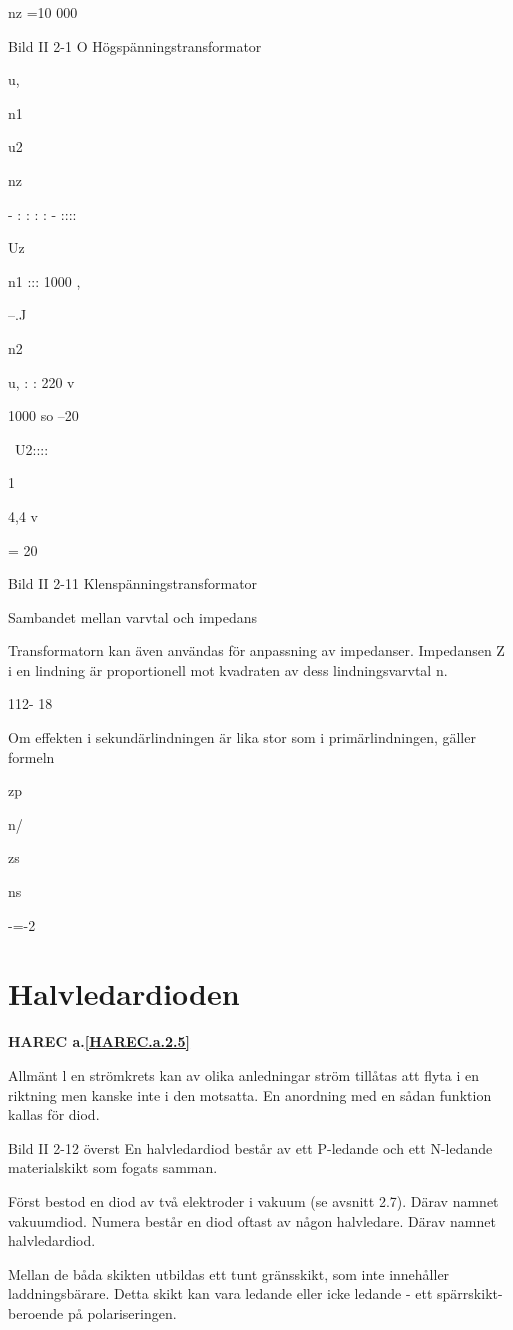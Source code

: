 {nz =10 000

Bild II 2-1 O Högspänningstransformator

u,

n1

u2

nz

- : : : : - ::::

Uz

n1 ::: 1000 ,   

--.J

n2

u, : : 220 v

1000
so
--20

~U2::::

1

4,4 v

= 20

Bild II 2-11 Klenspänningstransformator

Sambandet mellan varvtal och impedans

Transformatorn kan även användas för anpassning av impedanser. Impedansen Z i en
lindning är proportionell mot kvadraten av
dess lindningsvarvtal n.

112- 18

Om effekten i sekundärlindningen är lika
stor som i primärlindningen, gäller formeln

zp

n/

zs

ns

-=-2

\section{Halvledardioden}
\textbf{HAREC a.\ref{HAREC.a.2.5}\label{myHAREC.a.2.5}}

Allmänt
l en strömkrets kan av olika anledningar
ström tillåtas att flyta i en riktning men kanske inte i den motsatta. En anordning med
en sådan funktion kallas för diod.

Bild II 2-12 överst
En halvledardiod består av ett P-ledande
och ett N-ledande materialskikt som fogats
samman.

Först bestod en diod av två elektroder i
vakuum (se avsnitt 2.7). Därav namnet
vakuumdiod.
Numera består en diod oftast av någon
halvledare. Därav namnet halvledardiod.

Mellan de båda skikten utbildas ett tunt
gränsskikt, som inte innehåller laddningsbärare. Detta skikt kan vara ledande eller
icke ledande - ett spärrskikt- beroende på
polariseringen.

}
